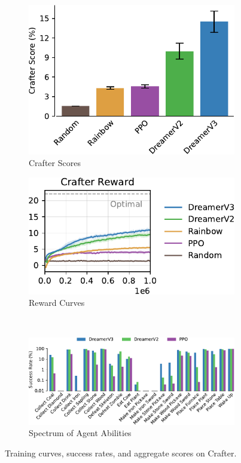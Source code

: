 \begin{figure}[h]
\centering
%
\begin{subfigure}{0.43\textwidth}
\includegraphics[width=1\linewidth]{crafter/scores-agents}
\caption{Crafter Scores}
\end{subfigure}\hfill%
%
\begin{subfigure}{0.5\textwidth}
\includegraphics[width=1\linewidth]{crafter/reward}
\caption{Reward Curves}
\end{subfigure}\\[2ex]
%
\begin{subfigure}{\textwidth}
\includegraphics[width=1\linewidth]{crafter/spectrum}
\caption{Spectrum of Agent Abilities}
\end{subfigure}
%
\caption{Training curves, success rates, and aggregate scores on Crafter.}
\label{fig:crafter}
\end{figure}
